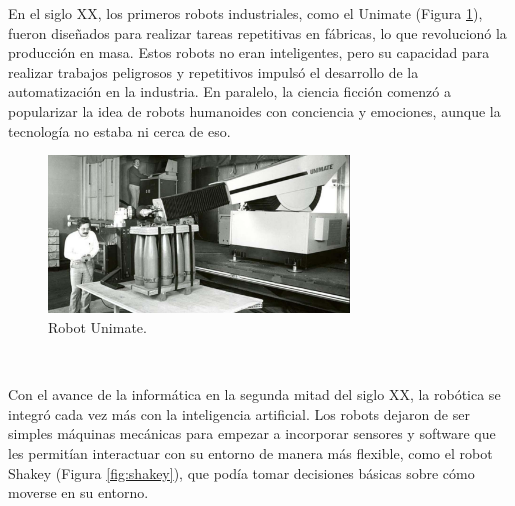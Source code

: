 En el siglo XX, los primeros robots industriales, como el Unimate (Figura \ref{fig:unimate}), fueron diseñados para realizar tareas repetitivas en fábricas, lo que revolucionó la producción en masa. Estos robots no eran inteligentes, pero su capacidad para realizar trabajos peligrosos y repetitivos impulsó el desarrollo de la automatización en la industria. En paralelo, la ciencia ficción comenzó a popularizar la idea de robots humanoides con conciencia y emociones, aunque la tecnología no estaba ni cerca de eso.\\

\begin{figure} [h!]
  \begin{center}
    \includegraphics[width=8cm]{figs/unimate}
  \end{center}
  \caption{Robot Unimate.}
  \label{fig:unimate}
\end{figure}\




Con el avance de la informática en la segunda mitad del siglo XX, la robótica se integró cada vez más con la inteligencia artificial. Los robots dejaron de ser simples máquinas mecánicas para empezar a incorporar sensores y software que les permitían interactuar con su entorno de manera más flexible, como el robot Shakey (Figura \ref{fig:shakey}), que podía tomar decisiones básicas sobre cómo moverse en su entorno.

